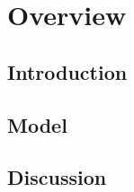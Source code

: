 \documentclass{book}
\begin{document}
\tableofcontents

\chapter{Overview}
    \section*{Introduction}
    \section{Model}
    \section{Discussion}
\noindent\hrulefill
\end{document}
